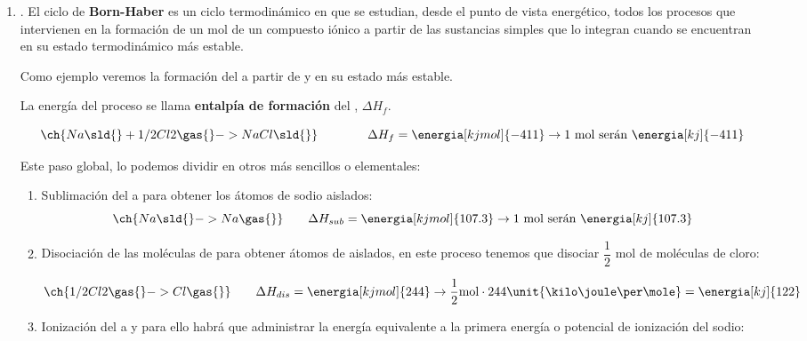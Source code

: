 \begin{enumerate}[label=\numberballmDarkTeal]
        \item {}.
        El ciclo de \textbf{Born-Haber} es un ciclo termodinámico en que se estudian, desde el punto de vista energético, todos los procesos que intervienen en la formación de un mol de un compuesto iónico a partir de las sustancias simples que lo integran cuando se encuentran en su estado termodinámico más estable.

        Como ejemplo veremos la formación del  a partir de  y  en su estado más estable.

        La energía del proceso se llama \textbf{entalpía de formación} del , \(\Delta H_f\).

        \begin{equation*}
            \ch{Na \sld{} + 1/2 Cl2 \gas{} -> NaCl \sld{}} \qquad \qquad \Delta H_f = \energia[kjmol]{-411} \rightarrow \text{1 mol serán } \energia[kj]{-411}
        \end{equation*}

        Este paso global, lo podemos dividir en otros más sencillos o elementales:

        \begin{enumerate}[label=\numberballmDarkTeal]
            \item Sublimación del  a  para obtener los átomos de sodio aislados:
            \begin{equation*}
                \ch{Na \sld{}  -> Na \gas{}} \qquad  \Delta H_{sub} = \energia[kjmol]{107.3} \rightarrow \text{1 mol serán } \energia[kj]{107.3}
            \end{equation*}

            \item Disociación de las moléculas de  para obtener átomos de  aislados, en este proceso tenemos que disociar \(\dfrac{1}{2}\) mol de moléculas de cloro:

            \begin{equation*}
                \ch{1/2 Cl2 \gas{}  -> Cl \gas{}} \qquad   \Delta H_{dis} = \energia[kjmol]{244} \rightarrow \dfrac{1}{2} \text{mol} \cdot 244 \unit{\kilo\joule\per\mole} =  \energia[kj]{122}
            \end{equation*}

            \item Ionización del  a  y para ello habrá que administrar la energía equivalente a la primera energía o potencial de ionización del sodio:


\end{enumerate}
\end{enumerate}
